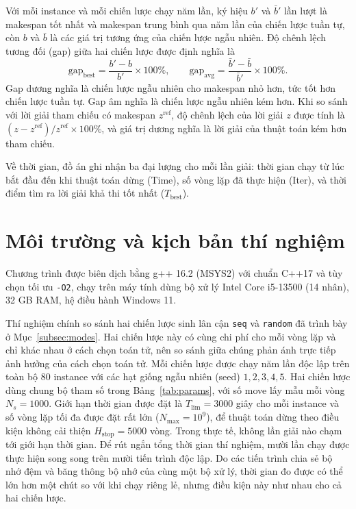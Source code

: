 \documentclass[../DoAn.tex]{subfiles}
\begin{document}
Với mỗi instance và mỗi chiến lược chạy năm lần, ký hiệu $b'$ và $\bar{b}'$ lần lượt là makespan tốt nhất và makespan trung bình qua năm lần của chiến lược tuần tự, còn $b$ và $\bar{b}$ là các giá trị tương ứng của chiến lược ngẫu nhiên. Độ chênh lệch tương đối (gap) giữa hai chiến lược được định nghĩa là
\begin{equation}
\mathrm{gap}_{\text{best}} = \frac{b' - b}{b'} \times 100\%, \qquad
\mathrm{gap}_{\text{avg}} = \frac{\bar{b}' - \bar{b}}{\bar{b}'} \times 100\%.
\label{eq:gap}
\end{equation}
Gap dương nghĩa là chiến lược ngẫu nhiên cho makespan nhỏ hơn, tức tốt hơn chiến lược tuần tự. Gap âm nghĩa là chiến lược ngẫu nhiên kém hơn. Khi so sánh với lời giải tham chiếu có makespan $z^{\text{ref}}$, độ chênh lệch của lời giải $z$ được tính là $(z - z^{\text{ref}})/z^{\text{ref}} \times 100\%$, và giá trị dương nghĩa là lời giải của thuật toán kém hơn tham chiếu.

Về thời gian, đồ án ghi nhận ba đại lượng cho mỗi lần giải: thời gian chạy từ lúc bắt đầu đến khi thuật toán dừng (Time), số vòng lặp đã thực hiện (Iter), và thời điểm tìm ra lời giải khả thi tốt nhất ($T_{\text{best}}$).

\section{Môi trường và kịch bản thí nghiệm}
\label{sec:exp_setup}

Chương trình được biên dịch bằng g++ 16.2 (MSYS2) với chuẩn C++17 và tùy chọn tối ưu \texttt{-O2}, chạy trên máy tính dùng bộ xử lý Intel Core i5-13500 (14 nhân), 32 GB RAM, hệ điều hành Windows 11.

Thí nghiệm chính so sánh hai chiến lược sinh lân cận \texttt{seq} và \texttt{random} đã trình bày ở Mục~\ref{subsec:modes}. Hai chiến lược này có cùng chi phí cho mỗi vòng lặp và chỉ khác nhau ở cách chọn toán tử, nên so sánh giữa chúng phản ánh trực tiếp ảnh hưởng của cách chọn toán tử. Mỗi chiến lược được chạy năm lần độc lập trên toàn bộ 80 instance với các hạt giống ngẫu nhiên (seed) $1, 2, 3, 4, 5$. Hai chiến lược dùng chung bộ tham số trong Bảng~\ref{tab:params}, với số move lấy mẫu mỗi vòng $N_s = 1000$. Giới hạn thời gian được đặt là $T_{\text{lim}} = 3000$ giây cho mỗi instance và số vòng lặp tối đa được đặt rất lớn ($N_{\max} = 10^9$), để thuật toán dừng theo điều kiện không cải thiện $H_{\text{stop}} = 5000$ vòng. Trong thực tế, không lần giải nào chạm tới giới hạn thời gian. Để rút ngắn tổng thời gian thí nghiệm, mười lần chạy được thực hiện song song trên mười tiến trình độc lập. Do các tiến trình chia sẻ bộ nhớ đệm và băng thông bộ nhớ của cùng một bộ xử lý, thời gian đo được có thể lớn hơn một chút so với khi chạy riêng lẻ, nhưng điều kiện này như nhau cho cả hai chiến lược.
\end{document}
